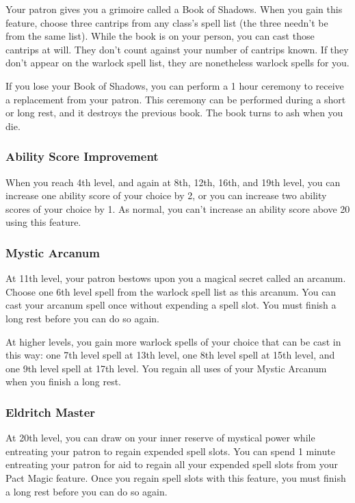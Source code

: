 \documentclass[
]{article}
\begin{document}
Your patron gives you a grimoire called a Book of Shadows. When you gain
this feature, choose three cantrips from any class's spell list (the
three needn't be from the same list). While the book is on your person,
you can cast those cantrips at will. They don't count against your
number of cantrips known. If they don't appear on the warlock spell
list, they are nonetheless warlock spells for you.

If you lose your Book of Shadows, you can perform a 1 hour ceremony to
receive a replacement from your patron. This ceremony can be performed
during a short or long rest, and it destroys the previous book. The book
turns to ash when you die.

\hypertarget{ability-score-improvement}{%
\subsubsection{Ability Score
Improvement}\label{ability-score-improvement}}

When you reach 4th level, and again at 8th, 12th, 16th, and 19th level,
you can increase one ability score of your choice by 2, or you can
increase two ability scores of your choice by 1. As normal, you can't
increase an ability score above 20 using this feature.

\hypertarget{mystic-arcanum}{%
\subsubsection{Mystic Arcanum}\label{mystic-arcanum}}

At 11th level, your patron bestows upon you a magical secret called an
arcanum. Choose one 6th level spell from the warlock spell list as this
arcanum. You can cast your arcanum spell once without expending a spell
slot. You must finish a long rest before you can do so again.

At higher levels, you gain more warlock spells of your choice that can
be cast in this way: one 7th level spell at 13th level, one 8th level
spell at 15th level, and one 9th level spell at 17th level. You regain
all uses of your Mystic Arcanum when you finish a long rest.

\hypertarget{eldritch-master}{%
\subsubsection{Eldritch Master}\label{eldritch-master}}

At 20th level, you can draw on your inner reserve of mystical power
while entreating your patron to regain expended spell slots. You can
spend 1 minute entreating your patron for aid to regain all your
expended spell slots from your Pact Magic feature. Once you regain spell
slots with this feature, you must finish a long rest before you can do
so again.
\end{document}
